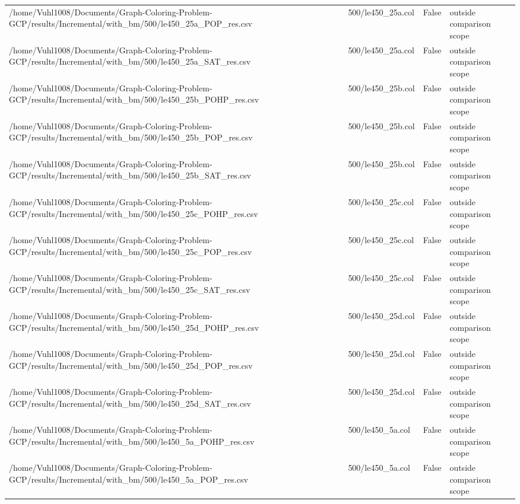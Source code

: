 \begin{table}[htbp]
\begin{tabular}{llll}
/home/Vuhl1008/Documents/Graph-Coloring-Problem-GCP/results/Incremental/with\_bm/500/le450\_25a\_POP\_res.csv & 500/le450\_25a.col & False & outside comparison scope \\
/home/Vuhl1008/Documents/Graph-Coloring-Problem-GCP/results/Incremental/with\_bm/500/le450\_25a\_SAT\_res.csv & 500/le450\_25a.col & False & outside comparison scope \\
/home/Vuhl1008/Documents/Graph-Coloring-Problem-GCP/results/Incremental/with\_bm/500/le450\_25b\_POHP\_res.csv & 500/le450\_25b.col & False & outside comparison scope \\
/home/Vuhl1008/Documents/Graph-Coloring-Problem-GCP/results/Incremental/with\_bm/500/le450\_25b\_POP\_res.csv & 500/le450\_25b.col & False & outside comparison scope \\
/home/Vuhl1008/Documents/Graph-Coloring-Problem-GCP/results/Incremental/with\_bm/500/le450\_25b\_SAT\_res.csv & 500/le450\_25b.col & False & outside comparison scope \\
/home/Vuhl1008/Documents/Graph-Coloring-Problem-GCP/results/Incremental/with\_bm/500/le450\_25c\_POHP\_res.csv & 500/le450\_25c.col & False & outside comparison scope \\
/home/Vuhl1008/Documents/Graph-Coloring-Problem-GCP/results/Incremental/with\_bm/500/le450\_25c\_POP\_res.csv & 500/le450\_25c.col & False & outside comparison scope \\
/home/Vuhl1008/Documents/Graph-Coloring-Problem-GCP/results/Incremental/with\_bm/500/le450\_25c\_SAT\_res.csv & 500/le450\_25c.col & False & outside comparison scope \\
/home/Vuhl1008/Documents/Graph-Coloring-Problem-GCP/results/Incremental/with\_bm/500/le450\_25d\_POHP\_res.csv & 500/le450\_25d.col & False & outside comparison scope \\
/home/Vuhl1008/Documents/Graph-Coloring-Problem-GCP/results/Incremental/with\_bm/500/le450\_25d\_POP\_res.csv & 500/le450\_25d.col & False & outside comparison scope \\
/home/Vuhl1008/Documents/Graph-Coloring-Problem-GCP/results/Incremental/with\_bm/500/le450\_25d\_SAT\_res.csv & 500/le450\_25d.col & False & outside comparison scope \\
/home/Vuhl1008/Documents/Graph-Coloring-Problem-GCP/results/Incremental/with\_bm/500/le450\_5a\_POHP\_res.csv & 500/le450\_5a.col & False & outside comparison scope \\
/home/Vuhl1008/Documents/Graph-Coloring-Problem-GCP/results/Incremental/with\_bm/500/le450\_5a\_POP\_res.csv & 500/le450\_5a.col & False & outside comparison scope \\

\end{tabular}
\end{table}
